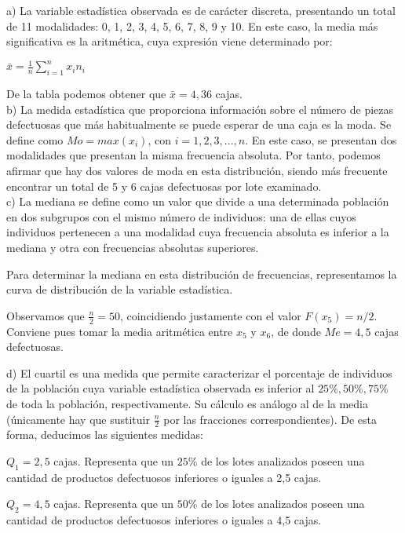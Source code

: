 a) La variable estadística observada es de carácter discreta, presentando un total de 11 modalidades: 0, 1, 2, 3, 4, 5, 6, 7, 8, 9 y 10. En este caso, la media más significativa es la aritmética, cuya expresión viene determinado por:

\begin{center}
	$\bar{x} = \frac{1}{n} \sum_{i=1}^{n}x_{i} n_{i}$ 
\end{center}

De la tabla podemos obtener que $\bar{x} = 4,36$ cajas. \\

b) La medida estadística que proporciona información sobre el número de piezas defectuosas que más habitualmente se puede esperar de una caja es la moda. Se define como $Mo = max(x_{i})$, con $i=1,2,3,...,n$. En este caso, se presentan dos modalidades que presentan la misma frecuencia absoluta. Por tanto, podemos afirmar que hay dos valores de moda en esta distribución, siendo más frecuente encontrar un total de 5 y 6 cajas defectuosas por lote examinado. \\

c) La mediana se define como un valor que divide a una determinada población en dos subgrupos con el mismo número de individuos: una de ellas cuyos individuos pertenecen a una modalidad cuya frecuencia absoluta es inferior a la mediana y otra con frecuencias absolutas superiores.

Para determinar la mediana en esta distribución de frecuencias, representamos la curva de distribución de la variable estadística. 

Observamos que $\frac{n}{2} = 50$, coincidiendo justamente con el valor $F(x_{5}) = n/2$. Conviene pues tomar la media aritmética entre $x_{5}$ y $x_{6}$, de donde $Me = 4,5$ cajas defectuosas.

d) El cuartil es una medida que permite caracterizar el porcentaje de individuos de la población cuya variable estadística observada es inferior al $25\%, 50\%, 75\%$ de toda la población, respectivamente. Su cálculo es análogo al de la media (únicamente hay que sustituir $\frac{n}{2}$ por las fracciones correspondientes). De esta forma, deducimos las siguientes medidas:

$Q_{1} = 2,5$ cajas. Representa que un $25\%$ de los lotes analizados poseen una cantidad de productos defectuosos inferiores o iguales a 2,5 cajas.

$Q_{2} = 4,5$ cajas. Representa que un $50\%$ de los lotes analizados poseen una cantidad de productos defectuosos inferiores o iguales a 4,5 cajas.

